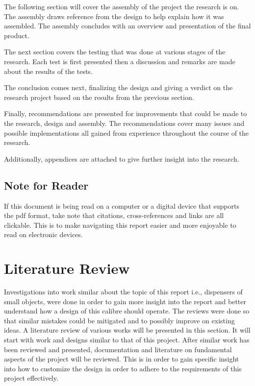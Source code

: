 \documentclass[a4paper,11pt]{article}
\numberwithin{figure}{section}
\numberwithin{table}{section}
\begin{document}
The following section will cover the assembly of the project the research is on. The assembly draws reference from the design to help explain how it was assembled. The assembly concludes with an overview and presentation of the final product.

The next section covers the testing that was done at various stages of the research. Each test is first presented then a discussion and remarks are made about the results of the tests.

The conclusion comes next, finalizing the design and giving a verdict on the research project based on the results from the previous section.

Finally, recommendations are presented for improvements that could be made to the research, design and assembly. The recommendations cover many issues and possible implementations all gained from experience throughout the course of the research.

Additionally, appendices are attached to give further insight into the research.
	\subsection{Note for Reader}
	If this document is being read on a computer or a digital device that supports the pdf format, take note that citations, cross-references and links are all clickable. This is to make navigating this report easier and more enjoyable to read on electronic devices.
	\newpage
\setlength{\parskip}{1em}
\section{Literature Review}\thispagestyle{sectionstart}
Investigations into work similar about the topic of this report i.e., dispensers of small objects, were done in order to gain more insight into the report and better understand how a design of this calibre should operate. The reviews were done so that similar mistakes could be mitigated and to possibly improve on existing ideas. A literature review of various works will be presented in this section. It will start with work and designs similar to that of this project. After similar work has been reviewed and presented, documentation and literature on fundamental aspects of the project will be reviewed. This is in order to gain specific insight into how to customize the design in order to adhere to the requirements of this project effectively. 
\end{document}
